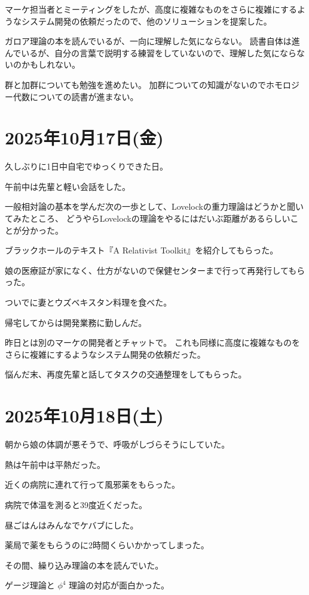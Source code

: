 \documentclass[uplatex]{jsarticle}
\begin{document}
マーケ担当者とミーティングをしたが、高度に複雑なものをさらに複雑にするようなシステム開発の依頼だったので、他のソリューションを提案した。

ガロア理論の本を読んでいるが、一向に理解した気にならない。
読書自体は進んでいるが、自分の言葉で説明する練習をしていないので、理解した気にならないのかもしれない。

群と加群についても勉強を進めたい。
加群についての知識がないのでホモロジー代数についての読書が進まない。

\section{2025年10月17日(金)}

久しぶりに1日中自宅でゆっくりできた日。

午前中は先輩と軽い会話をした。

一般相対論の基本を学んだ次の一歩として、Lovelockの重力理論はどうかと聞いてみたところ、
どうやらLovelockの理論をやるにはだいぶ距離があるらしいことが分かった。

ブラックホールのテキスト『A Relativist Toolkit』を紹介してもらった。

娘の医療証が家になく、仕方がないので保健センターまで行って再発行してもらった。

ついでに妻とウズベキスタン料理を食べた。

帰宅してからは開発業務に勤しんだ。

昨日とは別のマーケの開発者とチャットで。
これも同様に高度に複雑なものをさらに複雑にするようなシステム開発の依頼だった。

悩んだ末、再度先輩と話してタスクの交通整理をしてもらった。

\section{2025年10月18日(土)}

朝から娘の体調が悪そうで、呼吸がしづらそうにしていた。

熱は午前中は平熱だった。

近くの病院に連れて行って風邪薬をもらった。

病院で体温を測ると39度近くだった。

昼ごはんはみんなでケバブにした。

薬局で薬をもらうのに2時間くらいかかってしまった。

その間、繰り込み理論の本を読んでいた。

ゲージ理論と $\phi^{4}$ 理論の対応が面白かった。
\end{document}
